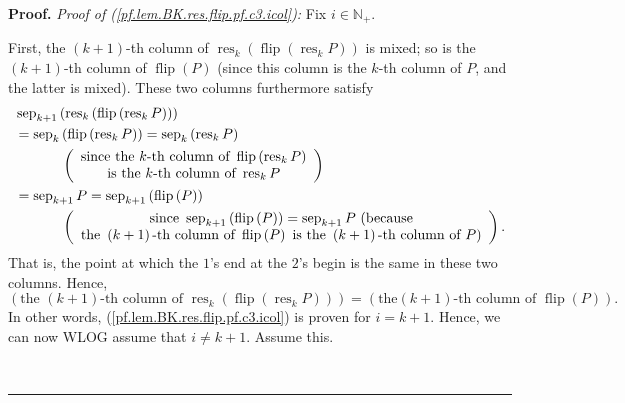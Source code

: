 \documentclass[numbers=enddot,12pt,final,onecolumn,notitlepage]{scrartcl}%
\theoremstyle{definition}
\newenvironment{proof}[1][Proof]{\noindent\textbf{#1.} }{\ \rule{0.5em}{0.5em}}
\begin{document}
\begin{proof}
\textit{Proof of (\ref{pf.lem.BK.res.flip.pf.c3.icol}):} Fix $i\in
\mathbb{N}_{+}$.

First, the $\left(  k+1\right)  $-th column of $\operatorname*{res}%
\nolimits_{k}\left(  \operatorname*{flip}\left(  \operatorname*{res}%
\nolimits_{k}P\right)  \right)  $ is mixed; so is the $\left(  k+1\right)
$-th column of $\operatorname*{flip}\left(  P\right)  $ (since this column is
the $k$-th column of $P$, and the latter is mixed). These two columns
furthermore satisfy%
\begin{align*}
&  \operatorname*{sep}\nolimits_{k+1}\left(  \operatorname*{res}%
\nolimits_{k}\left(  \operatorname*{flip}\left(  \operatorname*{res}%
\nolimits_{k}P\right)  \right)  \right) \\
&  =\operatorname*{sep}\nolimits_{k}\left(  \operatorname*{flip}\left(
\operatorname*{res}\nolimits_{k}P\right)  \right)  =\operatorname*{sep}%
\nolimits_{k}\left(  \operatorname*{res}\nolimits_{k}P\right) \\
&  \ \ \ \ \ \ \ \ \ \ \left(
\begin{array}
[c]{c}%
\text{since the }k\text{-th column of }\operatorname*{flip}\left(
\operatorname*{res}\nolimits_{k}P\right) \\
\text{is the }k\text{-th column of }\operatorname*{res}\nolimits_{k}P
\end{array}
\right) \\
&  =\operatorname*{sep}\nolimits_{k+1}P=\operatorname*{sep}\nolimits_{k+1}%
\left(  \operatorname*{flip}\left(  P\right)  \right) \\
&  \ \ \ \ \ \ \ \ \ \ \left(
\begin{array}
[c]{c}%
\text{since }\operatorname*{sep}\nolimits_{k+1}\left(  \operatorname*{flip}%
\left(  P\right)  \right)  =\operatorname*{sep}\nolimits_{k+1}P\text{
(because}\\
\text{the }\left(  k+1\right)  \text{-th column of }\operatorname*{flip}%
\left(  P\right)  \text{ is the }\left(  k+1\right)  \text{-th column of
}P\text{)}%
\end{array}
\right)  .
\end{align*}
That is, the point at which the $1$'s end at the $2$'s begin is the same in
these two columns. Hence,%
\[
\left(  \text{the }\left(  k+1\right)  \text{-th column of }%
\operatorname*{res}\nolimits_{k}\left(  \operatorname*{flip}\left(
\operatorname*{res}\nolimits_{k}P\right)  \right)  \right)  =\left(  \text{the
}\left(  k+1\right)  \text{-th column of }\operatorname*{flip}\left(
P\right)  \right)  .
\]
In other words, (\ref{pf.lem.BK.res.flip.pf.c3.icol}) is proven for $i=k+1$.
Hence, we can now WLOG assume that $i\neq k+1$. Assume this.


\end{proof}
\end{document}
